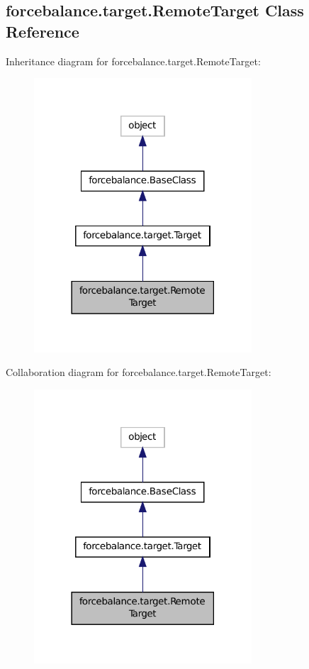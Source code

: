 \hypertarget{classforcebalance_1_1target_1_1RemoteTarget}{\subsection{forcebalance.\-target.\-Remote\-Target Class Reference}
\label{classforcebalance_1_1target_1_1RemoteTarget}
}


Inheritance diagram for forcebalance.\-target.\-Remote\-Target\-:\nopagebreak
\begin{figure}[H]
\begin{center}
\leavevmode
\includegraphics[width=230pt]{classforcebalance_1_1target_1_1RemoteTarget__inherit__graph}
\end{center}
\end{figure}


Collaboration diagram for forcebalance.\-target.\-Remote\-Target\-:\nopagebreak
\begin{figure}[H]
\begin{center}
\leavevmode
\includegraphics[width=230pt]{classforcebalance_1_1target_1_1RemoteTarget__coll__graph}
\end{center}
\end{figure}
